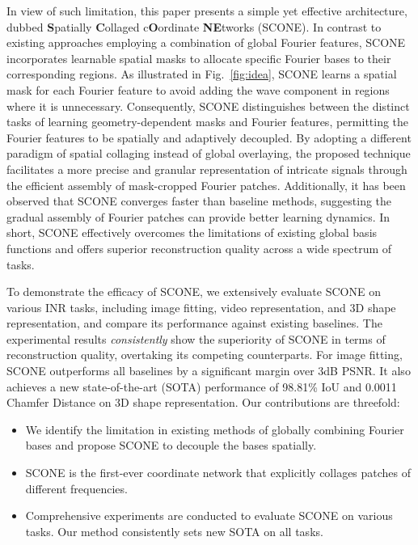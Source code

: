 \documentclass[letterpaper]{article} %
\begin{document}
In view of such limitation, this paper presents a simple yet effective architecture, dubbed \textbf{S}patially \textbf{C}ollaged c\textbf{O}ordinate \textbf{NE}tworks (SCONE). In contrast to existing approaches employing a combination of global Fourier features, SCONE incorporates learnable spatial masks to allocate specific Fourier bases to their corresponding regions. As illustrated in Fig.~\ref{fig:idea}, SCONE learns a spatial mask for each Fourier feature to avoid adding the wave component in regions where it is unnecessary. Consequently, SCONE distinguishes between the distinct tasks of learning geometry-dependent masks and Fourier features, permitting the Fourier features to be spatially and adaptively decoupled. By adopting a different paradigm of spatial collaging instead of global overlaying, the proposed technique facilitates a more precise and granular representation of intricate signals through the efficient assembly of mask-cropped Fourier patches. Additionally, it has been observed that SCONE converges faster than baseline methods, suggesting the gradual assembly of Fourier patches can provide better learning dynamics. In short, SCONE effectively overcomes the limitations of existing global basis functions and offers superior reconstruction quality across a wide spectrum of tasks.


To demonstrate the efficacy of SCONE, we extensively evaluate SCONE on various INR tasks, including image fitting, video representation, and 3D shape representation, and compare its performance against existing baselines. The experimental results \textit{consistently} show the superiority of SCONE in terms of reconstruction quality, overtaking its competing counterparts. For image fitting, SCONE outperforms all  baselines by a significant margin over 3dB PSNR. It also achieves a new state-of-the-art (SOTA) performance of 98.81\% IoU and 0.0011 Chamfer Distance on 3D shape representation. Our contributions are threefold:
\begin{itemize}
    \item We identify the limitation in existing methods of globally combining Fourier bases and propose SCONE to decouple the bases spatially.
    \item SCONE is the first-ever coordinate network that explicitly collages patches of different frequencies.
    \item Comprehensive experiments are conducted to evaluate SCONE on various tasks. Our method consistently sets new SOTA on all tasks. 
\end{itemize}
\end{document}
